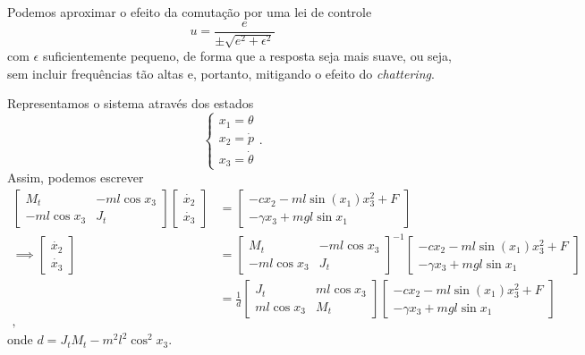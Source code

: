 \documentclass[a4paper]{report}
\begin{document}

Podemos aproximar o efeito da comutação por uma lei de controle \[
u = \frac{e}{\pm\sqrt{e^2 + \epsilon^2} }
\] com $\epsilon$ suficientemente pequeno, de forma que a resposta seja mais suave, ou seja, sem incluir frequências tão altas e, portanto, mitigando o efeito do \emph{chattering}.


Representamos o sistema através dos estados \[
\begin{cases}
    x_1 = \theta \\
    x_2 = \dot{p} \\
    x_3 = \dot{\theta}
\end{cases}
.\] Assim, podemos escrever
\begin{align*}
    \begin{bmatrix} M_t & -ml\cos x_3 \\ -ml\cos x_3 & J_t \end{bmatrix} \begin{bmatrix} \dot{x_2} \\ \dot{x_3} \end{bmatrix} &= \begin{bmatrix} 
    -cx_2 -ml\sin(x_1)x_3^2 + F \\
    -\gamma x_3 + mgl\sin x_1
\end{bmatrix} \\
    \implies \begin{bmatrix} \dot{x_2} \\ \dot{x_3} \end{bmatrix} &= \begin{bmatrix} M_t & -ml\cos x_3 \\ -ml\cos x_3 & J_t \end{bmatrix}^{-1} \begin{bmatrix} 
    -cx_2 -ml\sin(x_1)x_3^2 + F \\
    -\gamma x_3 + mgl\sin x_1
\end{bmatrix} \\
								  &= \frac{1}{d}\begin{bmatrix} J_t & ml\cos x_3 \\ ml\cos x_3 & M_t \end{bmatrix} \begin{bmatrix} 
    -cx_2 -ml\sin(x_1)x_3^2 + F \\
    -\gamma x_3 + mgl\sin x_1
\end{bmatrix} \tag{*} \\
,\end{align*} onde $d = J_tM_t - m^2l^2\cos^2x_3$.
\end{document}
